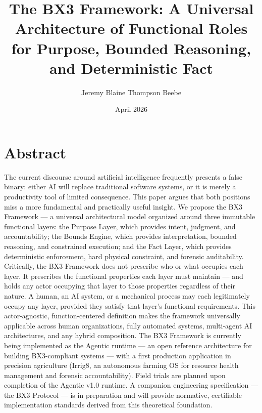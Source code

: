 \documentclass[11pt, a4paper]{article}
\title{\textbf{The BX3 Framework: A Universal Architecture of Functional Roles for Purpose, Bounded Reasoning, and Deterministic Fact}}
\author{Jeremy Blaine Thompson Beebe}
\affil{Independent Researcher}
\date{April 2026}
\begin{document}
\maketitle
\section*{Abstract}
The current discourse around artificial intelligence frequently presents a false binary: either AI will replace traditional software systems, or it is merely a productivity tool of limited consequence. This paper argues that both positions miss a more fundamental and practically useful insight. We propose the BX3 Framework --- a universal architectural model organized around three immutable functional layers: the Purpose Layer, which provides intent, judgment, and accountability; the Bounds Engine, which provides interpretation, bounded reasoning, and constrained execution; and the Fact Layer, which provides deterministic enforcement, hard physical constraint, and forensic auditability. Critically, the BX3 Framework does not prescribe who or what occupies each layer. It prescribes the functional properties each layer must maintain --- and holds any actor occupying that layer to those properties regardless of their nature. A human, an AI system, or a mechanical process may each legitimately occupy any layer, provided they satisfy that layer's functional requirements. This actor-agnostic, function-centered definition makes the framework universally applicable across human organizations, fully automated systems, multi-agent AI architectures, and any hybrid composition. The BX3 Framework is currently being implemented as the Agentic runtime --- an open reference architecture for building BX3-compliant systems --- with a first production application in precision agriculture (Irrig8, an autonomous farming OS for resource health management and forensic accountability). Field trials are planned upon completion of the Agentic v1.0 runtime. A companion engineering specification --- the BX3 Protocol --- is in preparation and will provide normative, certifiable implementation standards derived from this theoretical foundation.
\end{document}

